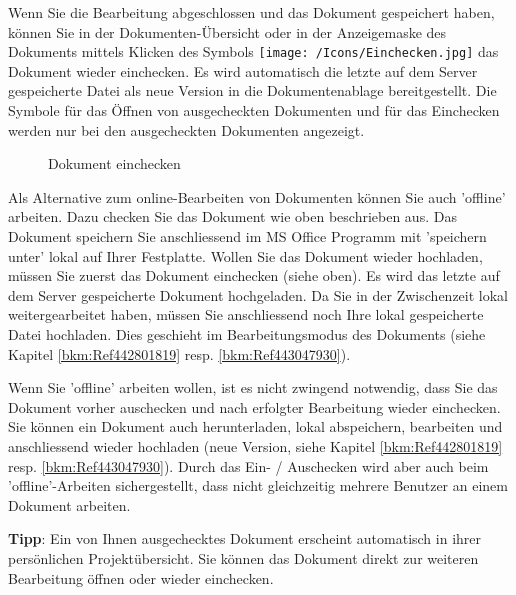 Wenn Sie die Bearbeitung abgeschlossen und das Dokument gespeichert haben, können Sie in der Dokumenten-Übersicht oder in der Anzeigemaske des
Dokuments mittels Klicken des Symbols \texttt{[image: /Icons/Einchecken.jpg]}  das Dokument wieder einchecken. Es wird automatisch die letzte auf dem Server gespeicherte Datei als neue Version in die Dokumentenablage bereitgestellt. Die Symbole für das Öffnen von ausgecheckten Dokumenten und für das Einchecken werden nur bei den ausgecheckten Dokumenten angezeigt.

\begin{figure}[H]
\caption{Dokument einchecken}
\end{figure}

Als Alternative zum online-Bearbeiten von Dokumenten können Sie auch 'offline' arbeiten. Dazu checken Sie das Dokument wie oben beschrieben aus. Das Dokument speichern Sie anschliessend im MS Office Programm mit 'speichern unter' lokal auf Ihrer Festplatte. Wollen Sie das Dokument wieder hochladen, müssen Sie
zuerst das Dokument einchecken (siehe oben). Es wird das letzte auf dem Server gespeicherte Dokument hochgeladen. Da Sie in der Zwischenzeit lokal weitergearbeitet haben, müssen Sie anschliessend noch Ihre lokal gespeicherte Datei hochladen. Dies geschieht im Bearbeitungsmodus des Dokuments (siehe Kapitel \ref{bkm:Ref442801819} resp. \ref{bkm:Ref443047930}). \newline

Wenn Sie 'offline' arbeiten wollen, ist es nicht zwingend notwendig, dass Sie das Dokument vorher auschecken und nach erfolgter Bearbeitung wieder einchecken. Sie können ein Dokument auch herunterladen, lokal abspeichern, bearbeiten und anschliessend wieder hochladen (neue Version, siehe Kapitel \ref{bkm:Ref442801819} resp. \ref{bkm:Ref443047930}). Durch das Ein- / Auschecken wird aber auch beim 'offline'-Arbeiten sichergestellt, dass nicht gleichzeitig mehrere Benutzer an einem Dokument arbeiten. 

\vspace{\baselineskip}

\textbf{Tipp}: Ein von Ihnen ausgechecktes Dokument erscheint automatisch in ihrer persönlichen Projektübersicht. Sie können das Dokument direkt zur weiteren Bearbeitung öffnen oder wieder einchecken. \newline

